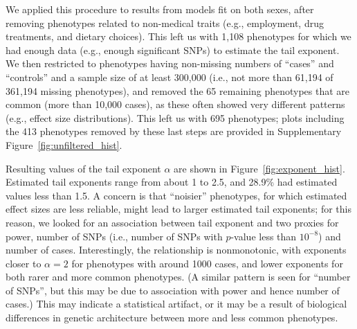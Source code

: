 \documentclass{article}
\newcommand{\1}{\mathbbm{1}}
\theoremstyle{remark}
\theoremstyle{definition}
\begin{document}
We applied this procedure to results from models fit on both sexes,
after removing phenotypes related to non-medical traits
(e.g., employment, drug treatments, and dietary choices).
This left us with 1,108 phenotypes for which we had enough data (e.g., enough significant SNPs)
to estimate the tail exponent.
We then restricted to phenotypes having non-missing numbers of ``cases'' and ``controls''
and a sample size of at least 300,000 (i.e., not more than 61,194 of 361,194 missing phenotypes),
and removed the 65 remaining phenotypes that are common (more than 10,000 cases),
as these often showed very different patterns
(e.g., effect size distributions).
This left us with 695 phenotypes;
plots including the 413 phenotypes removed by these last steps are provided in
Supplementary Figure~\ref{fig:unfiltered_hist}.

Resulting values of the tail exponent $\alpha$ are shown in Figure~\ref{fig:exponent_hist}.
Estimated tail exponents range from about 1 to 2.5,
and 28.9\% had estimated values less than 1.5.
A concern is that ``noisier'' phenotypes,
for which estimated effect sizes are less reliable,
might lead to larger estimated tail exponents;
for this reason, we looked for an association between
tail exponent and two proxies for power,
number of SNPs (i.e., number of SNPs with $p$-value less than $10^{-8}$)
and number of cases.
Interestingly, the relationship is nonmonotonic,
with exponents closer to $\alpha=2$ for phenotypes with around 1000 cases,
and lower exponents for both rarer and more common phenotypes.
(A similar pattern is seen for ``number of SNPs'',
but this may be due to association with power and hence number of cases.)
This may indicate a statistical artifact,
or it may be a result of biological differences in genetic architecture
between more and less common phenotypes.
\end{document}
